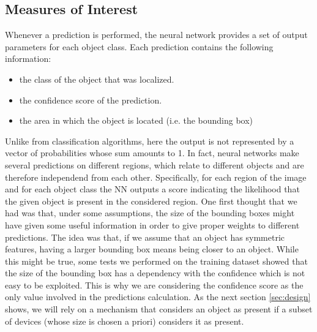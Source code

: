 \documentclass[10pt,conference,compsocconf]{IEEEtran}
\begin{document}
\subsection{Measures of Interest}
Whenever a prediction is performed, the neural network provides a set of output parameters for each object class. Each prediction contains the following information:
\begin{itemize}
\item the class of the object that was localized.
\item the confidence score of the prediction.
\item the area in which the object is located (i.e. the bounding box)
\end{itemize}
Unlike from classification algorithms, here the output is not represented by a vector of probabilities whose sum amounts to 1. In fact, neural networks make several predictions on different regions, which relate to different objects and are therefore independend from each other. Specifically, for each region of the image and for each object class the NN outputs a score indicating the likelihood that the given object is present in the considered region.
One first thought that we had was that, under some assumptions, the size of the bounding boxes might have given some useful information in order to give proper weights to different predictions. The idea was that, if we assume that an object has symmetric features, having a larger bounding box means being closer to an object. While this might be true, some tests we performed on the training dataset showed that the size of the bounding box has a dependency with the confidence which is not easy to be exploited. This is why we are considering the confidence score as the only value involved in the predictions calculation. As the next section \ref{sec:design} shows, we will rely on a mechanism that considers an object as present if a subset of devices (whose size is chosen a priori) considers it as present.
\end{document}
